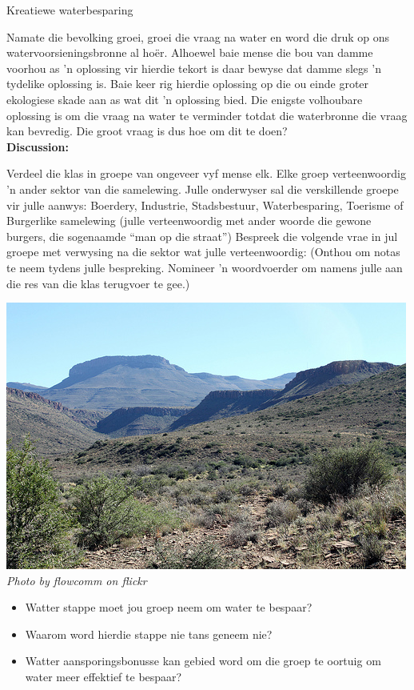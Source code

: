             \begin{groupdiscussion}{ Kreatiewe waterbesparing
}
            \nopagebreak

\label{m38138*uid289435}Namate die bevolking groei, groei die vraag na water en word die druk op ons watervoorsieningsbronne al hoër. Alhoewel baie mense die bou van damme voorhou as   'n oplossing vir hierdie tekort is daar bewyse dat damme slegs   'n tydelike oplossing is. Baie keer rig hierdie oplossing op die ou einde groter ekologiese skade aan as wat dit   'n oplossing bied. Die enigste volhoubare oplossing is om die vraag na water te verminder totdat die waterbronne die vraag kan bevredig. Die groot vraag is dus hoe om dit te doen?\\
\label{m38138*uid5630}\textbf{Discussion:}
\begin{minipage}{.6\textwidth}
 Verdeel die klas in groepe van ongeveer vyf mense elk. Elke groep verteenwoordig   'n ander sektor van die samelewing. Julle onderwyser sal die verskillende groepe vir julle aanwys: Boerdery, Industrie, Stadsbestuur, Waterbesparing, Toerisme of Burgerlike samelewing (julle verteenwoordig met ander woorde die gewone burgers, die sogenaamde “man op die straat”) Bespreek die volgende vrae in jul groepe met verwysing na die sektor wat julle verteenwoordig: (Onthou om notas te neem tydens julle bespreking. Nomineer   'n woordvoerder om namens julle aan die res van die klas terugvoer te gee.)
\end{minipage}
\begin{minipage}{.4\textwidth}
 \begin{center}
  \includegraphics[width=.6\textwidth]{photos/karoo_flowcomm.jpg} \\
\textsl{Photo by flowcomm on flickr}
 \end{center}

\end{minipage}
\label{m38138*id342317}\begin{itemize}[noitemsep]
            \label{m38138*uid88}\item Watter stappe moet jou groep neem om water te bespaar?
\label{m38138*uid89}\item Waarom word hierdie stappe nie tans geneem nie?
\label{m38138*uid90}\item Watter aansporingsbonusse kan gebied word om die groep te oortuig om water meer effektief te bespaar?
\end{itemize}


\end{groupdiscussion}
